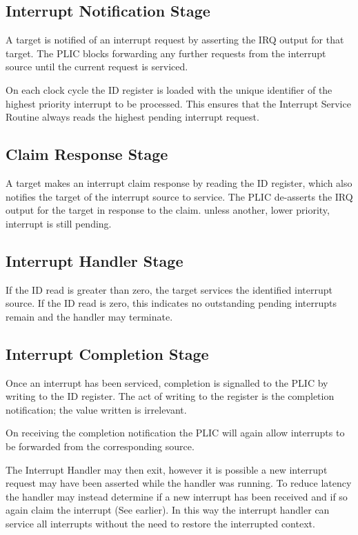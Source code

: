 \subsection{Interrupt Notification Stage}

A target is notified of an interrupt request by asserting the IRQ output for that target.
The PLIC blocks forwarding any further requests from the interrupt source until the current request is serviced.

On each clock cycle the ID register is loaded with the unique identifier of the highest priority interrupt to be processed.
This ensures that the Interrupt Service Routine always reads the highest pending interrupt request.

\subsection{Claim Response Stage} \label{sec:claim-response}

A target makes an interrupt claim response by reading the ID register,
which also notifies the target of the interrupt source to service. The
PLIC de-asserts the IRQ output for the target in response to the claim.
unless another, lower priority, interrupt is still pending.

\subsection{Interrupt Handler Stage}

If the ID read is greater than zero, the target services the identified interrupt source.
If the ID read is zero, this indicates no outstanding pending interrupts remain and the handler may terminate.

\subsection{Interrupt Completion Stage}

Once an interrupt has been serviced, completion is signalled to the PLIC by writing to the ID register.
The act of writing to the register is the completion notification; the value written is irrelevant.

On receiving the completion notification the PLIC will again allow interrupts to be forwarded from the corresponding source.

The Interrupt Handler may then exit, however it is possible a new
interrupt request may have been asserted while the handler was running.
To reduce latency the handler may instead determine if a new interrupt
has been received and if so again claim the interrupt (See earlier). In this
way the interrupt handler can service all interrupts without the need to
restore the interrupted context.

